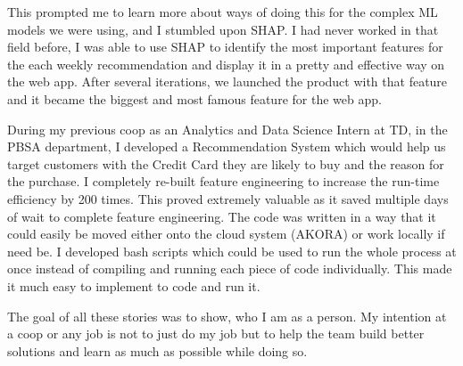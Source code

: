 \documentclass[11pt, a4paper]{awesome-cv}
\begin{document}
\begin{cvletter}
This prompted me to learn more about ways of doing this for the complex ML models we were using, and I stumbled upon SHAP. I had never worked in that field before, I was able to use SHAP to identify the most important features for the each weekly recommendation and display it in a pretty and effective way on the web app. After several iterations, we launched the product with that feature and it became the biggest and most famous feature for the web app.

During my previous coop as an Analytics and Data Science Intern at TD, in the PBSA department, I developed a Recommendation System which would help us target customers with the Credit Card they are likely to buy and the reason for the purchase. I completely re-built feature engineering to increase the run-time efficiency by 200 times. This proved extremely valuable as it saved multiple days of wait to complete feature engineering. The code was written in a way that it could easily be moved either onto the cloud system (AKORA) or work locally if need be. I developed bash scripts which could be used to run the whole process at once instead of compiling and running each piece of code individually. This made it much easy to implement to code and run it.

The goal of all these stories was to show, who I am as a person. My intention at a coop or any job is not to just do my job but to help the team build better solutions and learn as much as possible while doing so. 

\end{cvletter}


\makeletterclosing
\end{document}
